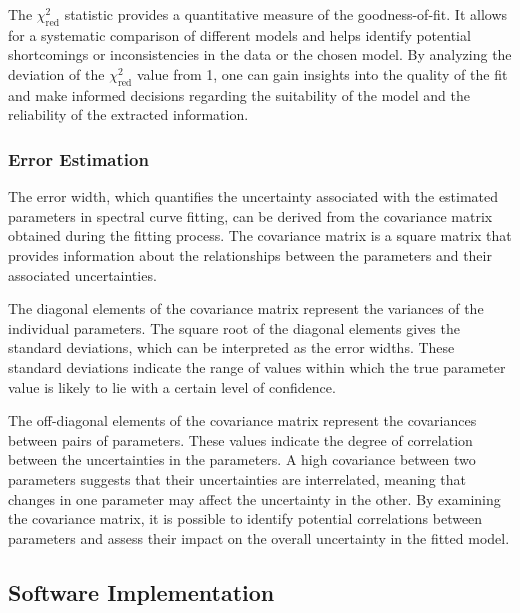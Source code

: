 				The $\chi^2_\text{red}$ statistic provides a quantitative measure of the goodness-of-fit. It allows for a systematic comparison of different models and helps identify potential shortcomings or inconsistencies in the data or the chosen model. By analyzing the deviation of the $\chi^2_\text{red}$ value from 1, one can gain insights into the quality of the fit and make informed decisions regarding the suitability of the model and the reliability of the extracted information.
			
			\subsubsection{Error Estimation}
				The error width, which quantifies the uncertainty associated with the estimated parameters in spectral curve fitting, can be derived from the covariance matrix obtained during the fitting process. The covariance matrix is a square matrix that provides information about the relationships between the parameters and their associated uncertainties.
				
				The diagonal elements of the covariance matrix represent the variances of the individual parameters. The square root of the diagonal elements gives the standard deviations, which can be interpreted as the error widths. These standard deviations indicate the range of values within which the true parameter value is likely to lie with a certain level of confidence.
				
				The off-diagonal elements of the covariance matrix represent the covariances between pairs of parameters. These values indicate the degree of correlation between the uncertainties in the parameters. A high covariance between two parameters suggests that their uncertainties are interrelated, meaning that changes in one parameter may affect the uncertainty in the other. By examining the covariance matrix, it is possible to identify potential correlations between parameters and assess their impact on the overall uncertainty in the fitted model.
			
    	\subsection{Software Implementation}
    		
